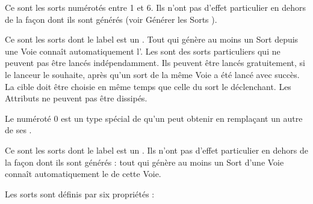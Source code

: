 \vspace*{-10pt}
\begin{multicols}{2}


\basicsubtitle{\learnedspells}

Ce sont les sorts numérotés entre 1 et 6. Ils n'ont pas d'effet particulier en dehors de la façon dont ils sont générés (voir \og Générer les Sorts \fg{}).

\vspace*{-25pt}
\basictitlenotoc{\attributespellnumber}

\basicsubtitle{\attributespells}

Ce sont les sorts dont le label est un \og \attributespellnumber{} \fg{}. Tout \wizard{} qui génère au moins un Sort depuis une Voie connaît automatiquement l'\attributespell{}. Les \attributespells{} sont des sorts particuliers qui ne peuvent pas être lancés indépendamment. Ils peuvent être lancés gratuitement, si le lanceur le souhaite, après qu'un sort de la même Voie a été lancé avec succès. La cible doit être choisie en même temps que celle du sort le déclenchant. Les Attributs ne peuvent pas être dissipés.

\columnbreak



Le \learnedspell{} numéroté 0 est un type spécial de \learnedspell{} qu'un \wizard{} peut obtenir en remplaçant un autre de ses \learnedspells{}.

\vspace*{-25pt}
\basictitlenotoc{\traitspellnumber}

\basicsubtitle{\traitspells}

Ce sont les sorts dont le label est un \og \traitspellnumber{} \fg{}. Ils n'ont pas d'effet particulier en dehors de la façon dont ils sont générés : tout \wizard{} qui génère au moins un Sort d'une Voie connaît automatiquement le \traitspell{} de cette Voie.

\vspace*{\fill}
\end{multicols}

Les sorts sont définis par six propriétés :

